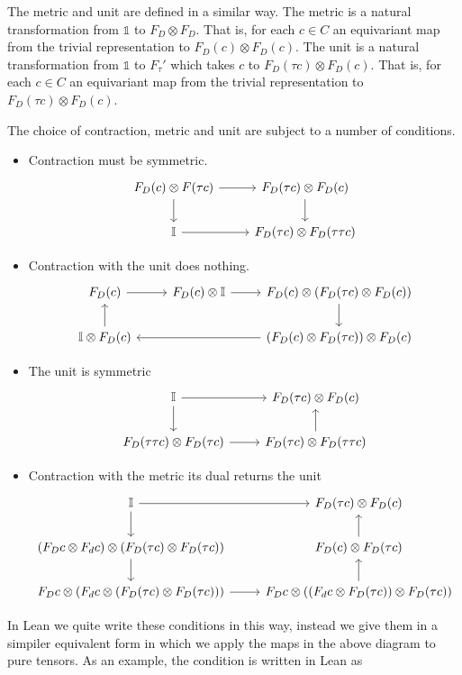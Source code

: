 \documentclass[a4paper, 11pt]{article}
\begin{document}
The metric and unit are defined in a similar way. The metric is a natural transformation from
$\mathbb{1}$ to $F_D\otimes F_D$. That is, for each $c \in C$ an equivariant map from the trivial
representation to $F_D(c) \otimes F_D(c)$. The unit is a natural transformation from $\mathbb{1}$ to
$F_\tau'$ which takes $c$ to $F_D(\tau c) \otimes F_D(c)$. That is, for each $c \in C$ an 
equivariant map from the trivial representation to  $F_D(\tau c) \otimes F_D(c)$.

The choice of contraction, metric and unit are subject to a number of conditions.
\begin{itemize}
\item Contraction must be symmetric.
\begin{equation}
  \begin{tikzcd}
    F_D(c) \otimes F(\tau c) \arrow[r] \arrow[d] & F_D(\tau c) \otimes F_D (c) \arrow[d] \\
    \mathbb{I} \arrow[r] & F_D(\tau c) \otimes F_D (\tau \tau c)
  \end{tikzcd}
  \end{equation}
  \item Contraction with the unit does nothing. 
  \begin{equation}
    \begin{tikzcd}
      F_D(c) \arrow[r] &  F_D(c) \otimes \mathbb{I} \arrow[r] & F_D(c) \otimes (F_D (\tau c) \otimes F_D(c)) \arrow[d] \\
      \mathbb{I} \otimes F_D(c) \arrow[u] &   &(F_D(c) \otimes F_D(\tau c)) \otimes F_D(c) \arrow[ll] 
  \end{tikzcd}
  \end{equation}
  \item The unit is symmetric 
  \begin{equation} 
    \begin{tikzcd}
      \mathbb{I} \arrow[r] \arrow[d] & F_D(\tau c) \otimes F_D(c) \\
      F_D(\tau \tau c) \otimes F_D(\tau c) \arrow[r] & F_D(\tau c) \otimes F_D(\tau \tau c) \arrow[u]
    \end{tikzcd}
  \end{equation}
  \item Contraction with the metric its dual returns the unit
  \begin{equation}
    \begin{tikzcd}
      \mathbb{I} \arrow[r] \arrow[d] & F_D(\tau c) \otimes F_D (c) \\ 
      (F_D c \otimes F_d c) \otimes (F_D (\tau c) \otimes F_D (\tau c) ) \arrow [d]  & F_D (c) \otimes F_D(\tau c) \arrow[u] \\ 
      F_D c \otimes (F_d c \otimes (F_D (\tau c) \otimes F_D (\tau c) )) \arrow [r] &  F_D c \otimes ((F_d c \otimes F_D (\tau c)) \otimes F_D (\tau c) ) \arrow[u]
    \end{tikzcd}
  \end{equation}
\end{itemize}
In Lean we quite write these conditions in this way, instead we give them in a simpiler equivalent form 
in which we apply the maps in the above diagram to pure tensors. As an example, 
the condition is written in Lean as 
\end{document}
